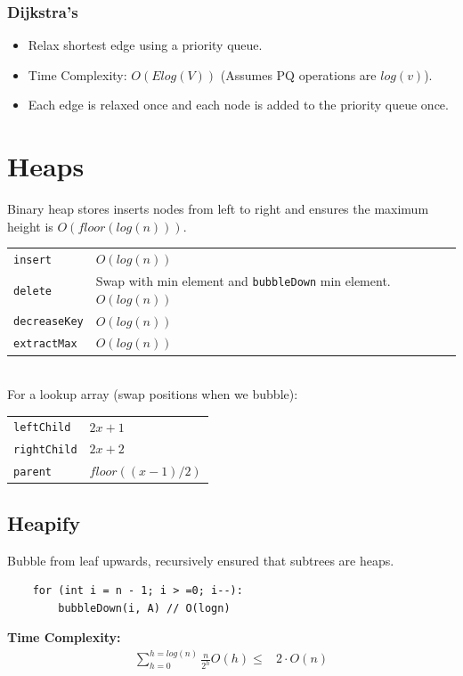 \documentclass[10pt,landscape,a4paper]{article}
\begin{document}
\begin{multicols*}{4}
\subsubsection{Dijkstra's}
\begin{itemize}
    \item Relax shortest edge using a priority queue.
    \item Time Complexity: $O(Elog(V))$ (Assumes PQ operations are $log(v)$).
    \item Each edge is relaxed once and each node is added to the priority queue once.
\end{itemize}


\section{Heaps}
Binary heap stores inserts nodes from left to right and ensures the maximum height is $O(floor(log(n)))$. \\
\begin{tabular}{p{2cm} p{4cm}}
   \verb!insert! & $O(log(n))$ \\
   \verb!delete! & Swap with min element and \texttt{bubbleDown} min element. $O(log(n))$ \\
   \verb!decreaseKey! & $O(log(n))$ \\
   \verb!extractMax!    & $O(log(n))$ \\
\end{tabular}\\
For a lookup array (swap positions when we bubble):
\begin{tabular}{p{2cm} p{4cm}}
    \verb!leftChild!    &   $2x+1$ \\
    \verb!rightChild!   &   $2x+2$  \\
    \verb!parent!       &   $floor((x-1)/2)$ 
\end{tabular}

\subsection{Heapify}
Bubble from leaf upwards, recursively ensured that subtrees are heaps.
\begin{lstlisting}
    for (int i = n - 1; i > =0; i--):
        bubbleDown(i, A) // O(logn)
\end{lstlisting}
\textbf{Time Complexity:}
\begin{align*}
    \sum_{h=0}^{h = log(n)} \frac{n}{2^h} O(h) 
    \le& 2 \cdot O(n)
\end{align*}


\end{multicols*}
\end{document}
